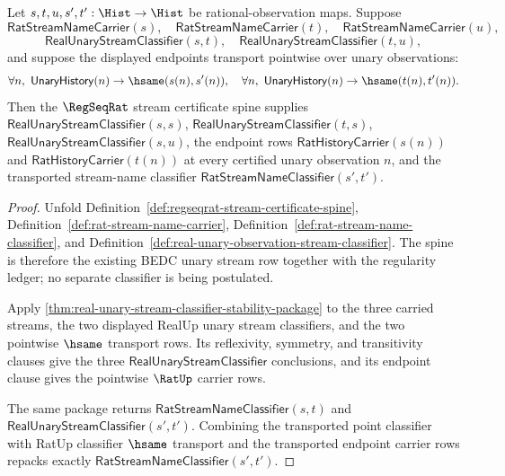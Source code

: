 \begin{theorem}
\label{thm:regseqrat-stream-classifier-stability-spine}
Let $s,t,u,s',t':\Hist\to\Hist$ be rational-observation maps. Suppose
$$
\mathsf{RatStreamNameCarrier}(s),\quad
\mathsf{RatStreamNameCarrier}(t),\quad
\mathsf{RatStreamNameCarrier}(u),
$$
$$
\mathsf{RealUnaryStreamClassifier}(s,t),\quad
\mathsf{RealUnaryStreamClassifier}(t,u),
$$
and suppose the displayed endpoints transport pointwise over unary
observations:
$$
\forall n,\ \mathsf{UnaryHistory}(n)\to\hsame(s(n),s'(n)),
\quad
\forall n,\ \mathsf{UnaryHistory}(n)\to\hsame(t(n),t'(n)).
$$
Then the $\RegSeqRat$ stream certificate spine supplies
$\mathsf{RealUnaryStreamClassifier}(s,s)$,
$\mathsf{RealUnaryStreamClassifier}(t,s)$,
$\mathsf{RealUnaryStreamClassifier}(s,u)$, the endpoint rows
$\mathsf{RatHistoryCarrier}(s(n))$ and
$\mathsf{RatHistoryCarrier}(t(n))$ at every certified unary observation $n$,
and the transported stream-name classifier
$\mathsf{RatStreamNameClassifier}(s',t')$.
\end{theorem}
\begin{proof}
Unfold Definition~\ref{def:regseqrat-stream-certificate-spine},
Definition~\ref{def:rat-stream-name-carrier},
Definition~\ref{def:rat-stream-name-classifier}, and
Definition~\ref{def:real-unary-observation-stream-classifier}. The spine is
therefore the existing BEDC unary stream row together with the regularity
ledger; no separate classifier is being postulated.

Apply \autoref{thm:real-unary-stream-classifier-stability-package} to the
three carried streams, the two displayed RealUp unary stream classifiers, and
the two pointwise $\hsame$ transport rows. Its reflexivity, symmetry, and
transitivity clauses give the three
$\mathsf{RealUnaryStreamClassifier}$ conclusions, and its endpoint clause gives
the pointwise $\RatUp$ carrier rows.

The same package returns
$\mathsf{RatStreamNameClassifier}(s,t)$ and
$\mathsf{RealUnaryStreamClassifier}(s',t')$. Combining the transported point
classifier with RatUp classifier $\hsame$ transport and the transported
endpoint carrier rows repacks exactly
$\mathsf{RatStreamNameClassifier}(s',t')$.
\end{proof}


